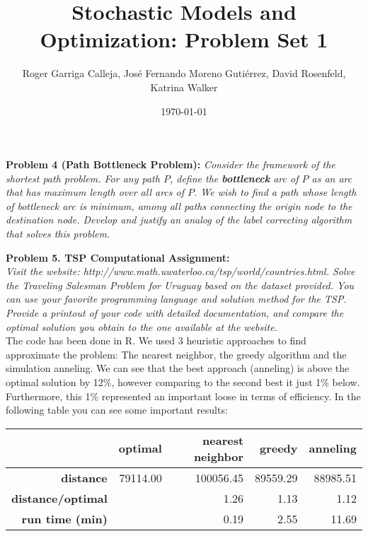 \documentclass[11pt, english]{article}
\title{Stochastic Models and Optimization: Problem Set 1}
\author{Roger Garriga Calleja, José Fernando Moreno Gutiérrez, David Rosenfeld, Katrina Walker}
\date{\today}
\begin{document}
\maketitle


\textbf{Problem 4 (Path Bottleneck Problem):}\textit{ Consider the framework of the shortest path problem. For any path $P$, define the \textbf{bottleneck} arc of $P$ as an arc that has maximum length over all arcs of $P$. We wish to find a path whose length of bottleneck arc is minimum, among all paths connecting the origin node to the destination node. Develop and justify an analog of the label correcting algorithm that solves this problem. }



\textbf{Problem 5. TSP Computational Assignment:}\\\textit{ Visit the website: http://www.math.uwaterloo.ca/tsp/world/countries.html.
Solve the Traveling Salesman Problem for Uruguay based on the dataset provided. You can use your favorite programming language and solution method for the TSP. Provide a printout of your code with detailed documentation, and compare the optimal solution you obtain to the one available at the website.}\\

The code has been done in R. We used 3 heuristic approaches to find approximate the problem: The nearest neighbor, the greedy algorithm and the simulation anneling. We can see that the best approach (anneling) is above the optimal solution by 12\%, however comparing to the second best it just 1\% below. Furthermore, this 1\% represented an important loose in terms of efficiency. In the following table you can see some important results:

\begin{table}[ht]
	\centering
	\begin{tabular}{rrrrr}
		\hline
		& \textbf{optimal} & \textbf{nearest neighbor} & \textbf{greedy} & \textbf{anneling} \\ 
		\hline
		\textbf{distance} & 79114.00 & 100056.45 & 89559.29 & 88985.51 \\ 
		\textbf{distance/optimal} &  & 1.26 & 1.13 & 1.12 \\ 
		\textbf{run time (min)} &  & 0.19 & 2.55 & 11.69 \\ 
		\hline
	\end{tabular}
\end{table}

\lstset{style=myCustomMatlabStyle2}


\end{document}
